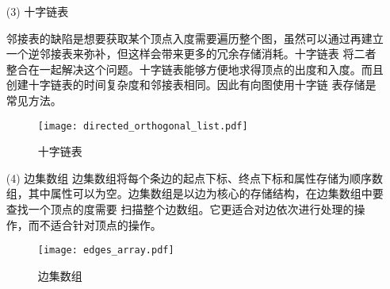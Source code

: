 \documentclass[master]{thesis-uestc}
\begin{document}
\begin{enumerate}
    \item[(3)] 十字链表
    
        邻接表的缺陷是想要获取某个顶点入度需要遍历整个图，虽然可以通过再建立一个逆邻接表来弥补，但这样会带来更多的冗余存储消耗。十字链表
    将二者整合在一起解决这个问题。十字链表能够方便地求得顶点的出度和入度。而且创建十字链表的时间复杂度和邻接表相同。因此有向图使用十字链
    表存储是常见方法。

    \begin{figure}[h]
        \texttt{[image: directed\_orthogonal\_list.pdf]}
        \caption{十字链表}
        \label{fig:orthogonal_list}
    \end{figure}

    \item[(4)] 边集数组
        边集数组将每个条边的起点下标、终点下标和属性存储为顺序数组，其中属性可以为空。边集数组是以边为核心的存储结构，在边集数组中要查找一个顶点的度需要
    扫描整个边数组。它更适合对边依次进行处理的操作，而不适合针对顶点的操作。
    
    \begin{figure}[h]
        \texttt{[image: edges\_array.pdf]}
        \caption{边集数组}
        \label{fig:edges_array}
    \end{figure}

\end{enumerate}
\end{document}
